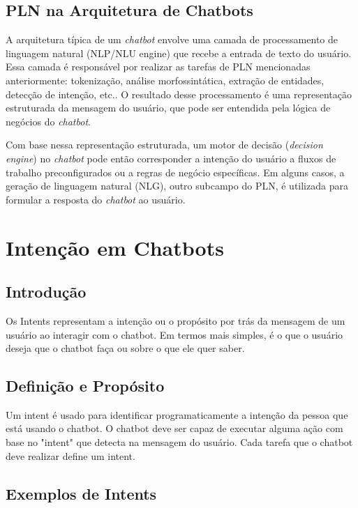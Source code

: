 \documentclass[14pt,a4paper,oneside]{book}
\begin{document}
\section{PLN na Arquitetura de Chatbots}

A arquitetura típica de um \textit{chatbot} envolve uma camada de processamento de linguagem natural (NLP/NLU engine) que recebe a entrada de texto do usuário. Essa camada é responsável por realizar as tarefas de PLN mencionadas anteriormente: tokenização, análise morfossintática, extração de entidades, detecção de intenção, etc.. O resultado desse processamento é uma representação estruturada da mensagem do usuário, que pode ser entendida pela lógica de negócios do \textit{chatbot}.

Com base nessa representação estruturada, um motor de decisão (\textit{decision engine}) no \textit{chatbot} pode então corresponder a intenção do usuário a fluxos de trabalho preconfigurados ou a regras de negócio específicas. Em alguns casos, a geração de linguagem natural (NLG), outro subcampo do PLN, é utilizada para formular a resposta do \textit{chatbot} ao usuário.


\chapter{Intenção em Chatbots}
\label{chap:intents}

\section{Introdução}

Os Intents representam a intenção ou o propósito por trás da mensagem de um usuário ao interagir com o chatbot. Em termos mais simples, é o que o usuário deseja que o chatbot faça ou sobre o que ele quer saber.

\section{Definição e Propósito}
\label{sec:intents_definicao}

Um intent é usado para identificar programaticamente a intenção da pessoa que está usando o chatbot. O chatbot deve ser capaz de executar alguma ação com base no "intent" que detecta na mensagem do usuário. Cada tarefa que o chatbot deve realizar define um intent.

\section{Exemplos de Intents}
\label{sec:intents_exemplos}
\end{document}
